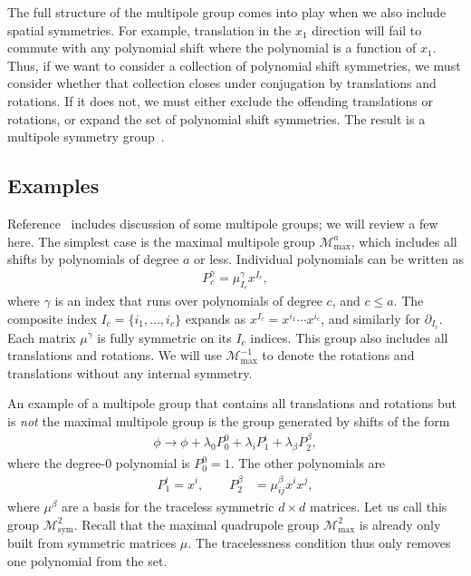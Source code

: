 \documentclass[prb,aps,twocolumn, amsfonts,amsmath,amssymb,nofootinbib,superscriptaddress]{revtex4-2}
\newcommand{\goesto}{\rightarrow}
\renewcommand{\max}{\text{max}}
\newcommand{\mmax}[1]{\mathcal{M}^{#1}_\max}
\begin{document}
The full structure of the multipole group comes into play when we also include spatial symmetries. For example,  translation in the $x_1$ direction will fail to commute with any polynomial shift where the polynomial is a function of $x_1$. Thus, if we want to consider a collection of polynomial shift symmetries, we must consider whether that collection closes under conjugation by translations and rotations. If it does not, we must either exclude the offending translations or rotations, or expand the set of polynomial shift symmetries. The result is a multipole symmetry group~\cite{Gromov2019}.

\subsection{Examples} \label{sub:examples}

Reference~\cite{Gromov2019} includes discussion of some multipole groups; we will review a few here. The simplest case is the maximal multipole group $\mathcal{M}^a_\text{max}$, which includes all shifts by polynomials of degree $a$ or less. Individual polynomials can be written as
\begin{align}
P_c^{\gamma} = \mu^{\gamma}_{I_c}x^{I_c}, \label{eqn:basis}
\end{align}
where $\gamma$ is an index that runs over polynomials of degree $c$, and $c\le a$. The composite index $I_c = \{i_1,\dots,i_c\}$  expands as $x^{I_c}=x^{i_1}\cdots x^{i_c}$, and similarly for $\partial_{I_c}$. Each  matrix  $\mu^{\gamma}$ is fully symmetric on its $I_c$ indices. This group also includes all translations and rotations. We will use $\mmax{-1}$ to denote the rotations and translations without any internal symmetry.

An example of a multipole group that contains all translations and rotations but is \emph{not} the maximal multipole group is the group generated by shifts of the form
\begin{align}
\phi \goesto \phi + \lambda_0 P_0^0 + \lambda_{i} P^{i}_1 + \lambda_{\beta} P^{\beta}_2,
\end{align}
where the degree-0 polynomial is $P_0^0=1$. The other polynomials are
\begin{align}
P_1^{i} = x^i,\quad \quad P_2^{\beta} &= \mu^{\beta}_{ij} x^i x^j,
\end{align}
where $\mu^{\beta}$ are a basis for the traceless symmetric $d\times d$ matrices. Let us call this group $\mathcal{M}^2_{\text{sym}}$. Recall that the maximal quadrupole group $\mathcal{M}^2_{\text{max}}$ is already only built from symmetric matrices $\mu$. The tracelessness condition thus only removes one polynomial from the set. 
\end{document}
